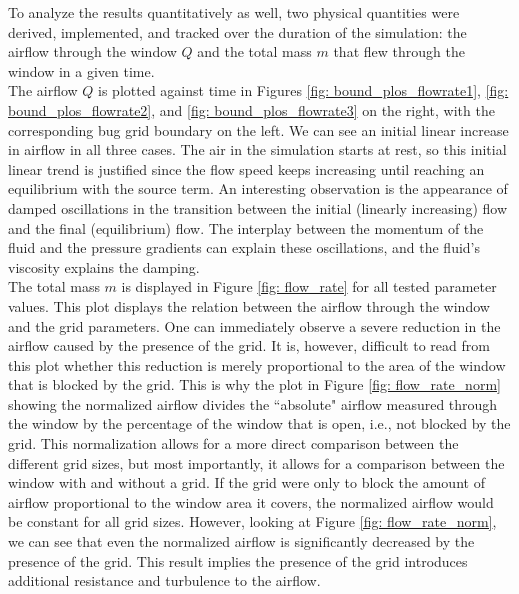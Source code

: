 To analyze the results quantitatively as well, two physical quantities were derived, implemented, and tracked over the duration of the simulation: the airflow through the window $Q$ and the total mass $m$ that flew through the window in a given time. \\
The airflow $Q$ is plotted against time in Figures \ref{fig: bound_plos_flowrate1}, \ref{fig: bound_plos_flowrate2}, and \ref{fig: bound_plos_flowrate3} on the right, with the corresponding bug grid boundary on the left. We can see an initial linear increase in airflow in all three cases. The air in the simulation starts at rest, so this initial linear trend is justified since the flow speed keeps increasing until reaching an equilibrium with the source term. An interesting observation is the appearance of damped oscillations in the transition between the initial (linearly increasing) flow and the final (equilibrium) flow. The interplay between the momentum of the fluid and the pressure gradients can explain these oscillations, and the fluid's viscosity explains the damping. \\
The total mass $m$ is displayed in Figure \ref{fig: flow_rate} for all tested parameter values.
This plot displays the relation between the airflow through the window and the grid parameters. One can immediately observe a severe reduction in the airflow caused by the presence of the grid. It is, however, difficult to read from this plot whether this reduction is merely proportional to the area of the window that is blocked by the grid. 
This is why the plot in Figure \ref{fig: flow_rate_norm} showing the normalized airflow divides the ``absolute" airflow measured through the window by the percentage of the window that is open, i.e., not blocked by the grid. This normalization allows for a more direct comparison between the different grid sizes, but most importantly, it allows for a comparison between the window with and without a grid. If the grid were only to block the amount of airflow proportional to the window area it covers, the normalized airflow would be constant for all grid sizes. However, looking at Figure \ref{fig: flow_rate_norm}, we can see that even the normalized airflow is significantly decreased by the presence of the grid. This result implies the presence of the grid introduces additional resistance and turbulence to the airflow.\\

